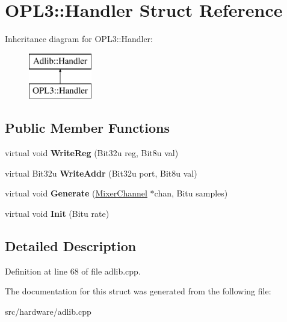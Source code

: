 \hypertarget{structOPL3_1_1Handler}{\section{O\-P\-L3\-:\-:Handler Struct Reference}
\label{structOPL3_1_1Handler}
}
Inheritance diagram for O\-P\-L3\-:\-:Handler\-:\begin{figure}[H]
\begin{center}
\leavevmode
\includegraphics[height=2.000000cm]{structOPL3_1_1Handler}
\end{center}
\end{figure}
\subsection*{Public Member Functions}
\begin{DoxyCompactItemize}
\item 
\hypertarget{structOPL3_1_1Handler_abd58ad3a3a13fcc8ef3e19bf1fd76bd1}{virtual void {\bfseries Write\-Reg} (Bit32u reg, Bit8u val)}\label{structOPL3_1_1Handler_abd58ad3a3a13fcc8ef3e19bf1fd76bd1}

\item 
\hypertarget{structOPL3_1_1Handler_aeb1af51c1839cc20712d4434077a7dcb}{virtual Bit32u {\bfseries Write\-Addr} (Bit32u port, Bit8u val)}\label{structOPL3_1_1Handler_aeb1af51c1839cc20712d4434077a7dcb}

\item 
\hypertarget{structOPL3_1_1Handler_ae5db8d97daf264ca7c1d4efd9a967323}{virtual void {\bfseries Generate} (\hyperlink{classMixerChannel}{Mixer\-Channel} $\ast$chan, Bitu samples)}\label{structOPL3_1_1Handler_ae5db8d97daf264ca7c1d4efd9a967323}

\item 
\hypertarget{structOPL3_1_1Handler_ac1b6b29e04d2c9bd45abad402a44e380}{virtual void {\bfseries Init} (Bitu rate)}\label{structOPL3_1_1Handler_ac1b6b29e04d2c9bd45abad402a44e380}

\end{DoxyCompactItemize}


\subsection{Detailed Description}


Definition at line 68 of file adlib.\-cpp.



The documentation for this struct was generated from the following file\-:\begin{DoxyCompactItemize}
\item 
src/hardware/adlib.\-cpp\end{DoxyCompactItemize}
